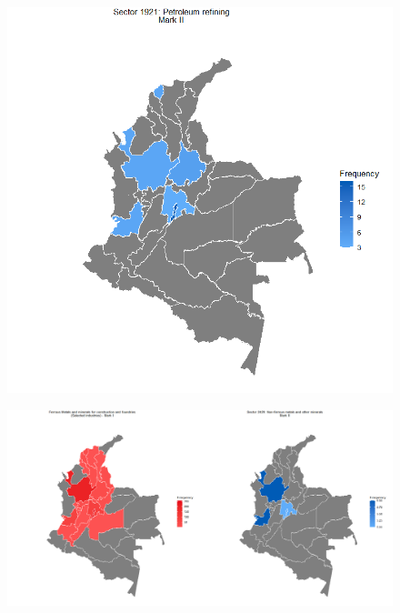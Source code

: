 \documentclass{beamer}
\begin{document}
\begin{frame}[allowframebreaks]
\begin{figure}
		\includegraphics[scale=0.25]{oil.png}
	\end{figure}
	\framebreak
	\begin{figure}
		\centering
		\includegraphics[scale=0.15]{metals.png}
	\end{figure}
	\end{frame}
\end{document}
